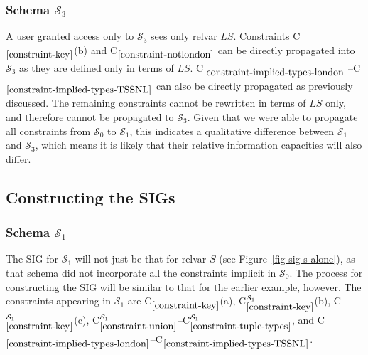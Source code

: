 \documentclass{sig-alternate-05-2015}
\newcounter{constraint}
\newcommand{\LS}{\ensuremath{\mathit{LS}}}
\newcommand{\SC}[1]{\ensuremath{\mathcal{S}_{#1}}}
\newcommand{\Constraint}[2][]{C\ensuremath{_{#2}\ifx&#1&\else^{#1}\fi}}
\begin{document}


\subsubsection{Schema \(\SC{3}\)}
\label{sec-constraints-s-iii}

\noindent A user granted access only to \(\SC{3}\) sees only relvar \(\LS\). Constraints \Constraint{\ref{constraint-key}}(b) and \Constraint{\ref{constraint-notlondon}} can be directly propagated into \(\SC{3}\) as they are defined only  in terms of \(\LS\). \Constraint{\ref{constraint-implied-types-london}}--\Constraint{\ref{constraint-implied-types-TSSNL}} can also be directly propagated as previously discussed. The remaining constraints cannot be rewritten in terms of \(\LS\) only, and therefore cannot be propagated to \(\SC{3}\). Given that we were able to propagate all constraints from \(\SC{0}\) to \(\SC{1}\), this indicates a qualitative difference between \(\SC{1}\) and \(\SC{3}\), which means it is likely that their relative information capacities will also differ.



\subsection{Constructing the SIGs}
\label{sec-date-sigs}




\subsubsection{Schema \(\SC{1}\)}
\label{sec-sigs-s-i}

\noindent The SIG for \(\SC{1}\) will not just be that for relvar \(S\) (see Figure~\ref{fig-sig-s-alone}), as that schema did not incorporate all the constraints implicit in \(\SC{0}\). The process for constructing the SIG will be similar to that for the earlier example, however. The constraints appearing in \(\SC{1}\) are \Constraint{\ref{constraint-key}}(a), \Constraint[\SC{1}]{\ref{constraint-key}}(b), \Constraint[\SC{1}]{\ref{constraint-key}}(c), \Constraint[\SC{1}]{\ref{constraint-union}}--\Constraint[\SC{1}]{\ref{constraint-tuple-types}}, and \Constraint{\ref{constraint-implied-types-london}}--\Constraint{\ref{constraint-implied-types-TSSNL}}.
\end{document}
